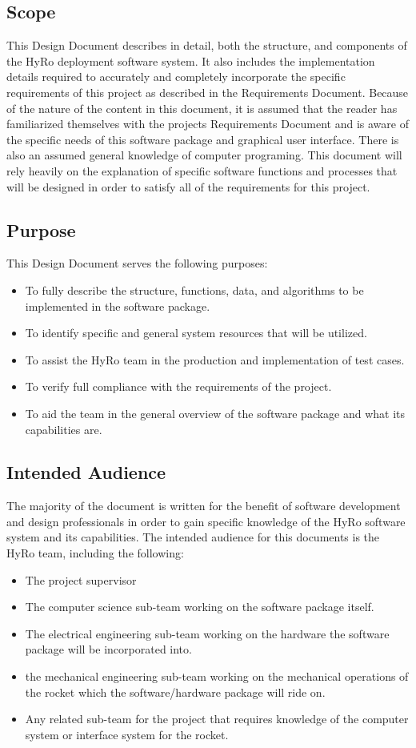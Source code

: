 \documentclass[10pt,draftclsnofoot,onecolumn,retainorgcmds]{IEEEtran}
\begin{document}
\subsection{Scope}
This Design Document describes in detail, both the structure, and components of the HyRo deployment software system. It also includes the implementation details required to accurately and completely incorporate the specific requirements of this project as described in the Requirements Document. Because of the nature of the content in this document, it is assumed that the reader has familiarized themselves with the projects Requirements Document and is aware of the specific needs of this software package and graphical user interface. There is also an assumed general knowledge of computer programing. This document will rely heavily on the explanation of specific software functions and processes that will be designed in order to satisfy all of the requirements for this project. 
\subsection{Purpose}
This Design Document serves the following purposes:
\begin{itemize}
	\item To fully describe the structure, functions, data, and algorithms to be implemented in the software package.
	\item To identify specific and general system resources that will be utilized.
	\item To assist the HyRo team in the production and implementation of test cases.
	\item To verify full compliance with the requirements of the project.
	\item To aid the team in the general overview of the software package and what its capabilities are.
\end{itemize}
\subsection{Intended Audience}
The majority of the document is written for the benefit of software development and design professionals in order to gain specific knowledge of the HyRo software system and its capabilities. The intended audience for this documents is the HyRo team, including the following:
\begin{itemize}
	\item The project supervisor 
	\item The computer science sub-team working on the software package itself.
	\item The electrical engineering sub-team working on the hardware the software package will be incorporated into.
	\item the mechanical engineering sub-team working on the mechanical operations of the rocket which the software/hardware package will ride on.
	\item Any related sub-team for the project that requires knowledge of the computer system or interface system for the rocket.
\end{itemize}
\end{document}
